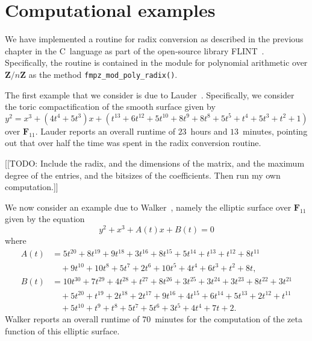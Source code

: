
\chapter{Computational examples}

We have implemented a routine for radix conversion as described 
in the previous chapter in the C~language as part of the open-source 
library FLINT~\citep{FLINT}.  Specifically, the routine is contained 
in the module for polynomial arithmetic over $\mathbf{Z}/n\mathbf{Z}$ 
as the method {\tt{fmpz\_mod\_poly\_radix()}}.

The first example that we consider is due to 
Lauder~\citep[Example~9.1]{Lauder2006}.  Specifically, we consider 
the toric compactification of the smooth surface given by 
\begin{equation*}
y^2 = x^3 + (4 t^4 + 5 t^3) x + 
    (t^{13} + 6 t^{12} + 5 t^{10} + 
    8 t^9 + 8 t^8 + 5 t^5 + t^4 + 5 t^3 + t^2 + 1)
\end{equation*}
over $\mathbf{F}_{11}$.  Lauder reports an overall runtime 
of $23$~hours and $13$~minutes, pointing out that over half the 
time was spent in the radix conversion routine.

[[TODO:  Include the radix, and the dimensions of the matrix, 
and the maximum degree of the entries, and the bitsizes of the 
coefficients.  Then run my own computation.]]

We now consider an example due to Walker~\citep[\S 7.5.1]{Walker2009}, 
namely the elliptic surface over $\mathbf{F}_{11}$ given by the 
equation 
\begin{equation*}
y^2 + x^3 + A(t) x + B(t) = 0
\end{equation*}
where
\begin{align*}
A(t) & = 5 t^{20} + 8 t^{19} + 9 t^{18} + 3 t^{16} + 8 t^{15} + 5 t^{14} + t^{13} + t^{12} + 8 t^{11} \\
     & \quad + 9 t^{10} + 10 t^{8} + 5 t^{7} + 2 t^{6} + 10 t^{5} + 4 t^{4} + 6 t^{3} + t^{2} + 8 t, \\
B(t) & = 10 t^{30} + 7 t^{29} + 4 t^{28} + t^{27} + 8 t^{26} + 3 t^{25} + 3 t^{24} + 3 t^{23} + 8 t^{22} + 3 t^{21} \\
     & \quad + 5 t^{20} + t^{19} + 2 t^{18} + 2 t^{17} + 9 t^{16} + 4 t^{15} + 6 t^{14} + 5 t^{13} + 2 t^{12} + t^{11} \\
     & \quad + 5 t^{10} + t^{9} + t^{8} + 5 t^{7} + 5 t^{6} + 3 t^{5} + 4 t^{4} + 7 t + 2.
\end{align*}
Walker reports an overall runtime of $70$~minutes for the computation 
of the zeta function of this elliptic surface. 

